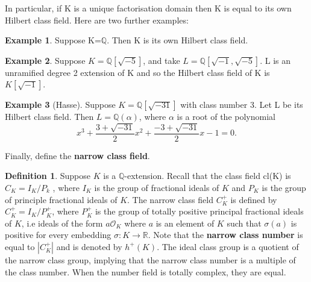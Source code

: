 \documentclass[12pt]{extarticle}
\newcommand{\Q}{\mathbb{Q}}
\newcommand{\<}{\langle}
\renewcommand{\>}{\rangle}
\theoremstyle{definition}
\newtheorem*{definition}{Definition}
\newtheorem*{example}{Example}
\begin{document}
In particular, if K is a unique factorisation domain then K is equal to its own Hilbert class field. 
Here are two further examples:
\begin{example}
    Suppose K=$\mathbb{Q}$. Then K is its own Hilbert class field. 
\end{example}
\begin{example}
    Suppose $K=\mathbb{Q}[\sqrt{-5}]$, and take $L=\mathbb{Q}[\sqrt{-1},\sqrt{-5}]$. L is an unramified degree 2 extension of K and so the Hilbert class field of K is $K[\sqrt{-1}]$.
\end{example}
\begin{example}[Hasse]
    Suppose $K=\mathbb{Q}[\sqrt{-31}]$ with class number 3. Let L be its Hilbert class field. Then $L = \Q(\alpha)$, where $\alpha$ is a root of the polynomial 
    \begin{equation}
        x^3+\frac{3+\sqrt{-31}}{2}x^2+\frac{-3+\sqrt{-31}}{2}x -1 =0.
    \end{equation}
\end{example}

Finally, define the \textbf{narrow class field}.
\begin{definition}
Suppose $K$ is a $\Q$-extension. Recall that the class field cl(K) is $C_K = I_K/P_k$ , where $I_K$ is the group of fractional ideals of $K$ and $P_K$ is the group of principle fractional ideals of $K$. The narrow class field $C_K^{+}$ is defined by $C_K^{+} = I_K/P_K^{+}$, where $P_K^{+}$ is the group of totally positive principal fractional ideals of $K$, i.e ideals of the form $a\mathcal{O}_K$ where $a$ is an element of $K$ such that $\sigma(a)$ is positive for every embedding $\sigma: K \rightarrow \mathbb{R}$. 
Note that the \textbf{narrow class number} is equal to $|C_K^{+}|$ and is denoted by $h^{+}(K)$. 
  The ideal class group is a quotient of the narrow class group, implying that the narrow class number is a multiple of the class number. When the number field is totally complex, they are equal. 


\end{definition}
\end{document}
